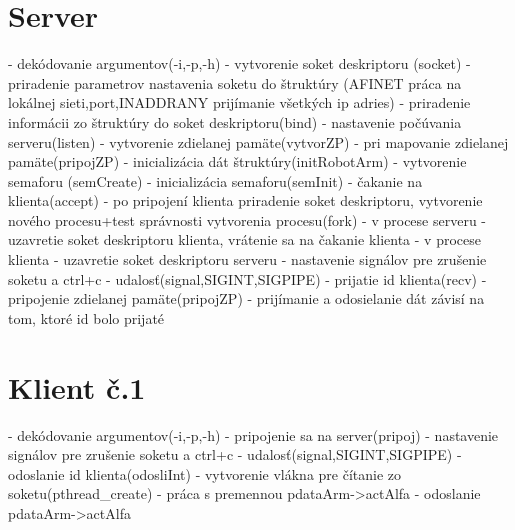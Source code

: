 \documentclass{article}
\begin{document}
\section{Server}
- dekódovanie argumentov(-i,-p,-h)\newline
- vytvorenie soket deskriptoru (socket)\newline
- priradenie parametrov nastavenia soketu do štruktúry (AFINET práca na lokálnej sieti,port,INADDRANY prijímanie všetkých ip adries)\newline
- priradenie informácii zo štruktúry do soket deskriptoru(bind)\newline
- nastavenie počúvania serveru(listen)\newline
- vytvorenie zdielanej pamäte(vytvorZP) \newline
- pri mapovanie zdielanej pamäte(pripojZP) \newline
- inicializácia dát štruktúry(initRobotArm)\newline
- vytvorenie semaforu (semCreate)\newline
- inicializácia semaforu(semInit)\newline
- čakanie na klienta(accept)\newline
- po pripojení klienta priradenie soket deskriptoru, vytvorenie nového procesu+test správnosti vytvorenia procesu(fork)\newline
- v procese serveru - uzavretie soket deskriptoru klienta, vrátenie sa na čakanie klienta\newline
- v procese klienta - uzavretie soket deskriptoru serveru\newline
- nastavenie signálov pre zrušenie soketu a ctrl+c - udalosť(signal,SIGINT,SIGPIPE)\newline
- prijatie id klienta(recv)\newline
- pripojenie zdielanej pamäte(pripojZP)\newline
- prijímanie a odosielanie dát závisí na tom, ktoré id bolo prijaté
\section{Klient č.1}
- dekódovanie argumentov(-i,-p,-h)\newline
- pripojenie sa na server(pripoj)\newline
- nastavenie signálov pre zrušenie soketu a ctrl+c - udalosť(signal,SIGINT,SIGPIPE)\newline
- odoslanie id klienta(odosliInt)\newline
- vytvorenie vlákna pre čítanie zo soketu(pthread\_create)\newline
- práca s premennou pdataArm->actAlfa\newline
- odoslanie pdataArm->actAlfa\newline
\end{document}
